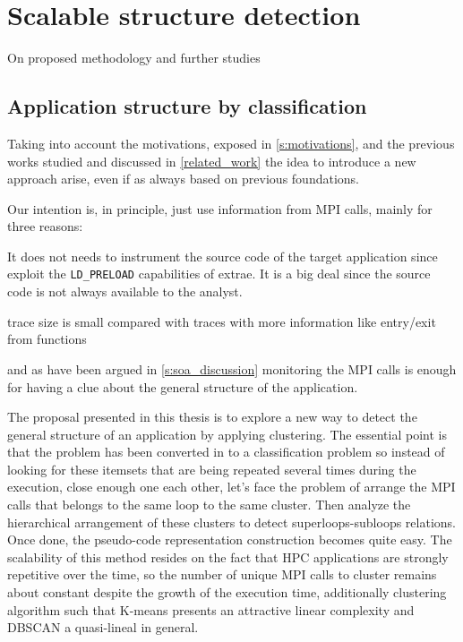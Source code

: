 
\chapter{Scalable structure detection}

On proposed methodology and further studies

\section{Application structure by
classification}\label{s:app_structire_by_classification}

Taking into account the motivations, exposed in \ref{s:motivations}, and the
previous works studied and discussed in \ref{related_work} the idea to introduce
a new approach arise, even if as always based on previous foundations.  
 
Our intention is, in principle, just use information from MPI calls, mainly for 
three reasons:
\begin{enumerate*}[label=\roman*)]
  \item It does not needs to instrument the source code of the target
    application since exploit the \texttt{LD\_PRELOAD} capabilities of extrae.
    It is a big deal since the source code is not always available to the
    analyst.
  \item trace size is small compared with traces with more information
    like entry/exit from functions
  \item and as have been argued in \ref{s:soa_discussion} monitoring the MPI 
    calls is enough for having a clue about the general structure of the 
    application.
\end{enumerate*}

The proposal presented in this thesis is to explore a new way to detect the
 general structure of an application by applying clustering. 
The essential point is that the problem has been converted in to a classification 
problem so instead of looking for these itemsets that are being
repeated several times during the execution, close enough one each other, let's
face the problem of arrange the MPI calls that belongs to the same loop to the
same cluster. Then analyze the hierarchical arrangement of these clusters to
detect superloops-subloops relations. Once done, the pseudo-code representation 
construction becomes quite easy. The scalability of this method resides on the 
fact that
HPC applications are strongly repetitive over the time, so the number of unique
MPI calls to cluster remains about constant despite the growth of the execution
time, additionally clustering algorithm such that K-means presents an attractive 
linear complexity and DBSCAN a quasi-lineal in general.

